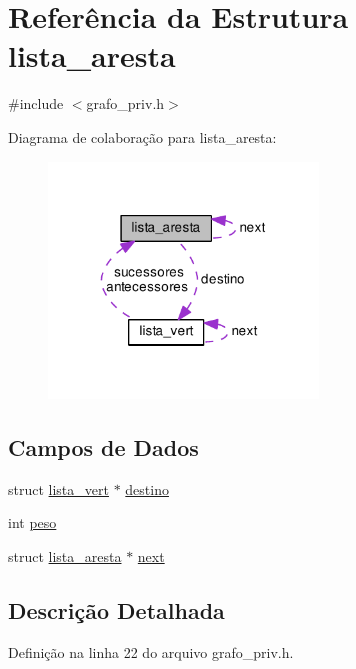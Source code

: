 \hypertarget{structlista__aresta}{}\section{Referência da Estrutura lista\+\_\+aresta}
\label{structlista__aresta}


{\ttfamily \#include $<$grafo\+\_\+priv.\+h$>$}



Diagrama de colaboração para lista\+\_\+aresta\+:\nopagebreak
\begin{figure}[H]
\begin{center}
\leavevmode
\includegraphics[width=203pt]{structlista__aresta__coll__graph}
\end{center}
\end{figure}
\subsection*{Campos de Dados}
\begin{DoxyCompactItemize}
\item 
struct \hyperlink{structlista__vert}{lista\+\_\+vert} $\ast$ \hyperlink{structlista__aresta_a324d065ab2fc1df5d59128027c4c8a5a}{destino}
\item 
int \hyperlink{structlista__aresta_aecaf90a9521bc8a80a0b67f80603b6ce}{peso}
\item 
struct \hyperlink{structlista__aresta}{lista\+\_\+aresta} $\ast$ \hyperlink{structlista__aresta_a55d9a8d5fcc901c1d8802239735b4af7}{next}
\end{DoxyCompactItemize}


\subsection{Descrição Detalhada}


Definição na linha 22 do arquivo grafo\+\_\+priv.\+h.



